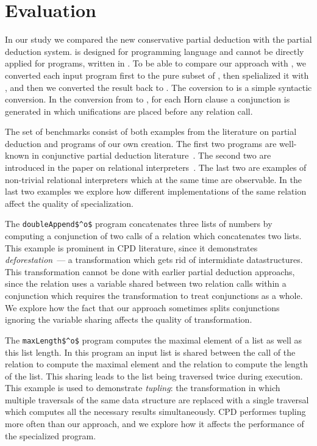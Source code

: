 \section{Evaluation}

In our study we compared the new conservative partial deduction with the \ecce partial deduction system.
\ecce is designed for \pro programming language and cannot be directly applied for programs, written in \mk.
To be able to compare our approach with \ecce, we converted each input program first to the pure subset of \pro, then spelialized it with \ecce, and then we converted the result back to \mk.
The coversion to \pro is a simple syntactic conversion. In the conversion from \pro to \mk, for each Horn clause a conjunction is generated in which unifications are placed before any relation call.


The set of benchmarks consist of both examples from the literature on partial deduction and programs of our own creation.
The first two programs are well-known in conjunctive partial deduction literature~\cite{de1999conjunctive}.
The second two are introduced in the paper on relational interpreters~\cite{lozov2019relational}.
The last two are examples of non-trivial relational interpreters which at the same time are observable.
In the last two examples we explore how different implementations of the same relation affect the quality of specialization.

The \lstinline{doubleAppend$^o$} program concatenates three lists of numbers by computing a conjunction of two calls of a relation which concatenates two lists.
This example is prominent in CPD literature, since it demonstrates \emph{deforestation}~--- a transformation which gets rid of intermidiate datastructures.
This transformation cannot be done with earlier partial deduction approachs, since the relation uses a variable shared between two relation calls within a
conjunction which requires the transformation to treat conjunctions as a whole.
We explore how the fact that our approach sometimes splits conjunctions ignoring the variable sharing affects the quality of transformation.

The \lstinline{maxLength$^o$} program computes the maximal element of a list as well as this list length.
In this program an input list is shared between the call of the relation to compute the maximal element and the relation to compute the length of the list.
This sharing leads to the list being traversed twice during execution.
This example is used to demonstrate \emph{tupling}: the transformation in which multiple traversals of the same data structure are replaced with a single traversal which
computes all the necessary results simultaneously. CPD performes tupling more often than our approach, and we explore how it affects the performance of the specialized program.

